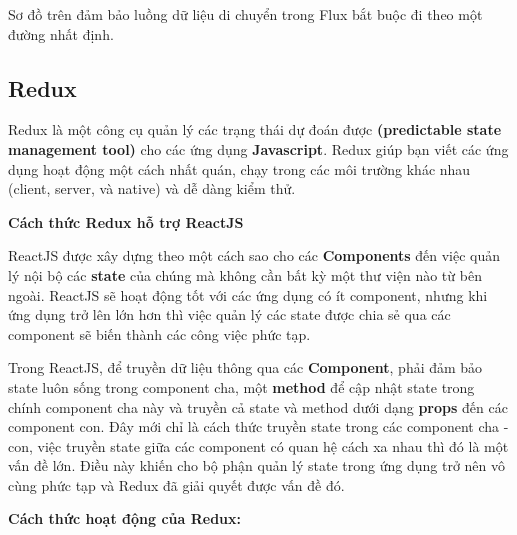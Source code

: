Sơ đồ trên đảm bảo luồng dữ liệu di chuyển trong Flux bắt buộc đi theo một đường nhất định.
\subsection{Redux}
Redux là một công cụ quản lý các trạng thái dự đoán được \textbf{(predictable state management tool)} cho các ứng dụng \textbf{Javascript}. Redux giúp bạn viết các ứng dụng hoạt động một cách nhất quán, chạy trong các môi trường khác nhau (client, server, và native) và dễ dàng kiểm thử.


\textbf{Cách thức Redux hỗ trợ ReactJS}


ReactJS được xây dựng theo một cách sao cho các \textbf{Components} đến việc quản lý nội bộ các \textbf{state} của chúng mà không cần bất kỳ một thư viện nào từ bên ngoài. ReactJS sẽ hoạt động tốt với các ứng dụng có ít component, nhưng khi ứng dụng trở lên lớn hơn thì việc quản lý các state được chia sẻ qua các component sẽ biến thành các công việc phức tạp.


Trong ReactJS, để truyền dữ liệu thông qua các \textbf{Component}, phải đảm bảo state luôn sống trong component cha, một \textbf{method} để cập nhật state trong chính component cha này và truyền cả state và method dưới dạng \textbf{props} đến các component con. Đây mới chỉ là cách thức truyền state trong các component cha - con, việc truyền state giữa các component có quan hệ cách xa nhau thì đó là một vấn đề lớn. Điều này khiến cho bộ phận quản lý state trong ứng dụng trở nên vô cùng phức tạp và Redux đã giải quyết được vấn đề đó.


\textbf{Cách thức hoạt động của Redux:}

